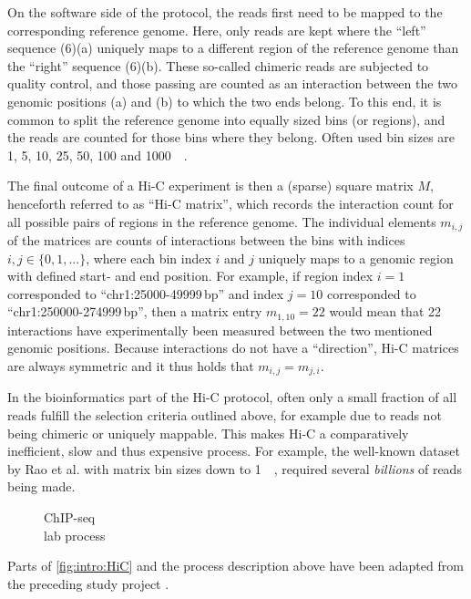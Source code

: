 On the software side of the protocol, the reads first need to be mapped 
to the corresponding reference genome.
Here, only reads are kept where the ``left'' sequence (6)(a)
uniquely maps to a different region of the reference genome than the ``right'' sequence (6)(b).
These so-called chimeric reads are subjected to quality control, and those passing are counted as an interaction
between the two genomic positions (a) and (b) to which the two ends belong.
To this end, it is common to split the reference genome into equally sized bins (or regions), 
and the reads are counted for those bins where they belong. 
Often used bin sizes are 1, 5, 10, 25, 50, 100 and \SI{1000}{\kilo\bp}.

The final outcome of a Hi-C experiment is then a (sparse) square matrix $M$, henceforth referred to as ``Hi-C matrix'', 
which records the interaction count for all possible pairs of regions in the reference genome.
The individual elements $m_{i,j}$ of the matrices are counts of interactions between the bins with indices $i,j \in \{0,1,...\}$,
where each bin index $i$ and $j$ uniquely maps to a genomic region with defined start- and end position.
For example, if region index $i=1$ corresponded to ``chr1:25000-49999\,bp'' and index $j=10$ corresponded to ``chr1:250000-274999\,bp'',
then a matrix entry $m_{1,10}=22$ would mean that 22 interactions have experimentally been measured between the two mentioned genomic positions.
Because interactions do not have a ``direction'', Hi-C matrices are always symmetric and it thus holds that $m_{i,j} = m_{j,i}$.

In the bioinformatics part of the Hi-C protocol, often only a small fraction of all reads 
fulfill the selection criteria outlined above, for example due to reads not being chimeric or uniquely mappable.
This makes Hi-C a comparatively inefficient, slow and thus expensive process.
For example, the well-known dataset by Rao et al. \cite{Rao2014} with matrix bin sizes down to \SI{1}{\kilo\bp}, required several \emph{billions} of reads being made. 

\begin{wrapfigure}[28]{r}{0.3\textwidth}
 \vspace{-4mm}
 \caption[ChIP-seq lab process]{ChIP-seq\\lab process}
 \label{fig:intro:chipseq1}
\end{wrapfigure}
Parts of \cref{fig:intro:HiC} and the process description above 
have been adapted from the preceding study project \cite{Krauth2020}.


